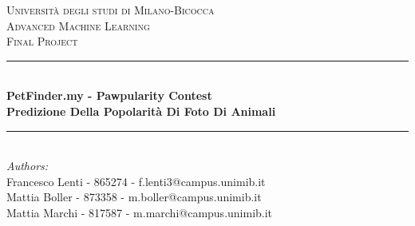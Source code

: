 \begin{titlepage}

\newcommand{\HRule}{\rule{\linewidth}{0.5mm}} %

\center %
 

\textsc{\LARGE Università degli studi di Milano-Bicocca}\\[1cm] %
\textsc{\Large Advanced Machine Learning }\\[0.3cm] %
\textsc{\large Final Project}\\[0.1cm] %


\HRule \\[0.4cm]
{ \huge \bfseries PetFinder.my - Pawpularity Contest}\\[0.4cm] %
{ \large \textbf{Predizione Della Popolarità Di Foto Di Animali}}
\HRule \\[1.5cm]
 

\large
\emph{Authors:}\\
Francesco Lenti - 865274 - f.lenti3@campus.unimib.it \\   %
Mattia Boller - 873358 - m.boller@campus.unimib.it   \\
Mattia Marchi - 817587 - m.marchi@campus.unimib.it   \\[1cm] %




\end{titlepage}
